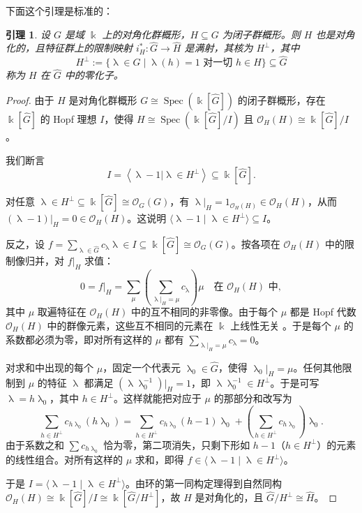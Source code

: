 \documentclass[11pt,a4paper]{article}
\DeclareMathOperator{\Spec}{\mathrm{Spec}}
\DeclareMathOperator{\field}{\mathbb{k}}
\DeclareMathOperator{\cha}{\lambda}
\theoremstyle{cnth}
\newtheorem{lemma}[thm]{引理}
\begin{document}
下面这个引理是标准的：

\begin{lemma}\cite[Exercise 2.8]{Waterhouse}
\label{lem:DiagonalizableSurjective}
设 $G$ 是域 $\field$ 上的对角化群概形，$H \subseteq G$ 为闭子群概形。则 $H$ 也是对角化的，且特征群上的限制映射
$
i_H^* : \widehat{G} \rightarrow \widehat{H}
$
是满射，其核为 $H^\perp$，其中
$$
H^\perp
:=
\{ \cha \in \widehat{G} \mid \cha(h) = 1 \text{ 对一切 } h \in H \}
\subseteq
\widehat{G}
$$
称为 $H$ 在 $\widehat{G}$ 中的零化子。
\end{lemma}

\begin{proof}
由于 $H$ 是对角化群概形 $G\cong \Spec(\field[\widehat{G}])$ 的闭子群概形，存在 $\field[\widehat{G}]$ 的 Hopf 理想 $I$，使得 $H\cong\Spec(\field[\widehat{G}]/I)$ 且 $\mathcal{O}_H(H)\cong\field[\widehat{G}]/I$。

我们断言
$$
I=\left<\cha-1|\cha\in H^\perp\right>
\subseteq
\field[\widehat{G}].
$$

对任意 $\cha \in H^\perp\subseteq\field[\widehat{G}]\cong\mathcal{O}_G(G)$，有 $\cha|_H=1_{\mathcal{O}_H(H)}\in\mathcal{O}_H(H)$，从而 $(\cha-1)|_H=0\in \mathcal{O}_H(H)$。这说明 $\langle \cha - 1 \mid \cha \in H^\perp \rangle \subseteq I$。

反之，设 $f = \sum_{\cha \in \widehat{G}} c_{\cha} \cha \in I\subseteq\field[\widehat{G}]\cong\mathcal{O}_G(G)$。按各项在 $\mathcal{O}_H(H)$ 中的限制像归并，对 $f|_H$ 求值：
$$
0 = f|_H = \sum_{\mu} \left( \sum_{\cha|_H = \mu} c_{\cha} \right) \mu \quad \text{在 } \mathcal{O}_H(H) \text{ 中},
$$
其中 $\mu$ 取遍特征在 $\mathcal{O}_H(H)$ 中的互不相同的非零像。由于每个 $\mu$ 都是 Hopf 代数 $\mathcal{O}_H(H)$ 中的群像元素，这些互不相同的元素在 $\field$ 上线性无关
\cite[\S2.2]{Waterhouse}。于是每个 $\mu$ 的系数都必须为零，即对所有这样的 $\mu$ 都有 $\sum_{\cha|_H = \mu} c_{\cha} = 0$。

对求和中出现的每个 $\mu$，固定一个代表元 $\cha_0 \in \widehat{G}$，使得 $\cha_0|_H = \mu$。任何其他限制到 $\mu$ 的特征 $\cha$ 都满足 $(\cha \cha_0^{-1})|_H = 1$，即 $\cha \cha_0^{-1} \in H^\perp$。于是可写 $\cha = h\cha_0$，其中 $h \in H^\perp$。这样就能把对应于 $\mu$ 的那部分和改写为
$$
\sum_{h \in H^\perp} c_{h\cha_0} (h\cha_0) = \sum_{h \in H^\perp} c_{h\cha_0} (h - 1)\cha_0 + \left( \sum_{h \in H^\perp} c_{h\cha_0} \right) \cha_0.
$$
由于系数之和 $\sum c_{h\cha_0}$ 恰为零，第二项消失，只剩下形如 $h-1$（$h \in H^\perp$）的元素的线性组合。对所有这样的 $\mu$ 求和，即得 $f \in \langle \cha - 1 \mid \cha \in H^\perp \rangle$。

于是 $I = \langle \cha - 1 \mid \cha \in H^\perp \rangle$。由环的第一同构定理得到自然同构 $\mathcal{O}_H(H) \cong \field[\widehat{G}]/I \cong \field[\widehat{G}/H^\perp]$，故 $H$ 是对角化的，且 $\widehat{G}/H^\perp\cong\widehat{H}$。
\end{proof}
\end{document}
